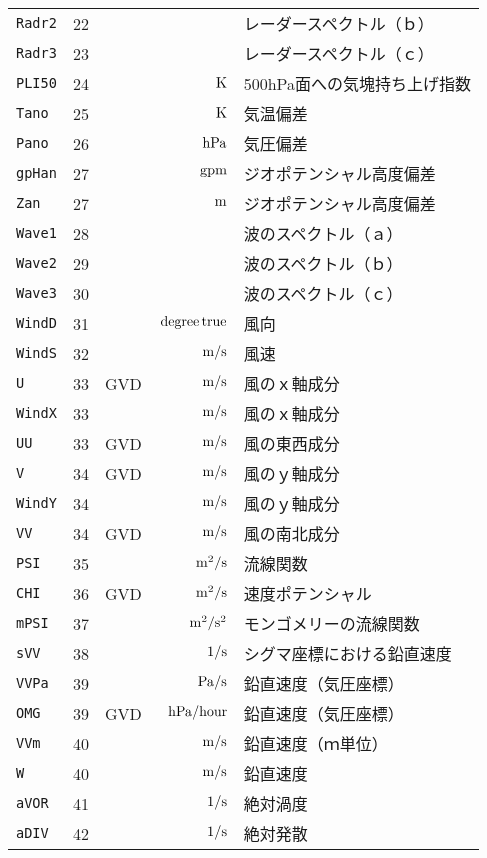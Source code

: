 \begin{longtable}{l|rrrp{}}
{\tt Radr2} & 22 &  &  & レーダースペクトル（ｂ） \\
{\tt Radr3} & 23 &  &  & レーダースペクトル（ｃ） \\
{\tt PLI50} & 24 &  & ${\rm\,K}$ & 500hPa面への気塊持ち上げ指数 \\
{\tt Tano} & 25 &  & ${\rm\,K}$ & 気温偏差 \\
{\tt Pano} & 26 &  & ${\rm\,hPa}$ & 気圧偏差 \\
{\tt gpHan} & 27 &  & ${\rm\,gpm}$ & ジオポテンシャル高度偏差 \\
{\tt Zan} & 27 &  & ${\rm\,m}$ & ジオポテンシャル高度偏差 \\
{\tt Wave1} & 28 &  &  & 波のスペクトル（ａ） \\
{\tt Wave2} & 29 &  &  & 波のスペクトル（ｂ） \\
{\tt Wave3} & 30 &  &  & 波のスペクトル（ｃ） \\
{\tt WindD} & 31 &  & ${\rm\,degree\,true}$ & 風向 \\
{\tt WindS} & 32 &  & ${\rm\,m/s}$ & 風速 \\
{\tt U} & 33 & GVD & ${\rm\,m/s}$ & 風のｘ軸成分 \\
{\tt WindX} & 33 &  & ${\rm\,m/s}$ & 風のｘ軸成分 \\
{\tt UU} & 33 & GVD & ${\rm\,m/s}$ & 風の東西成分 \\
{\tt V} & 34 & GVD & ${\rm\,m/s}$ & 風のｙ軸成分 \\
{\tt WindY} & 34 &  & ${\rm\,m/s}$ & 風のｙ軸成分 \\
{\tt VV} & 34 & GVD & ${\rm\,m/s}$ & 風の南北成分 \\
{\tt PSI} & 35 &  & ${\rm\,m^2/s}$ & 流線関数 \\
{\tt CHI} & 36 & GVD & ${\rm\,m^2/s}$ & 速度ポテンシャル \\
{\tt mPSI} & 37 &  & ${\rm\,m^2/s^2}$ & モンゴメリーの流線関数 \\
{\tt sVV} & 38 &  & ${\rm\,1/s}$ & シグマ座標における鉛直速度 \\
{\tt VVPa} & 39 &  & ${\rm\,Pa/s}$ & 鉛直速度（気圧座標） \\
{\tt OMG} & 39 & GVD & ${\rm\,hPa/hour}$ & 鉛直速度（気圧座標） \\
{\tt VVm} & 40 &  & ${\rm\,m/s}$ & 鉛直速度（ｍ単位） \\
{\tt W} & 40 &  & ${\rm\,m/s}$ & 鉛直速度 \\
{\tt aVOR} & 41 &  & ${\rm\,1/s}$ & 絶対渦度 \\
{\tt aDIV} & 42 &  & ${\rm\,1/s}$ & 絶対発散 \\

\end{longtable}
